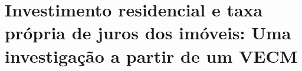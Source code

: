 \chapter{Investimento residencial e taxa própria de juros dos imóveis: Uma investigação a partir de um VECM}
\label{CapFatos}








